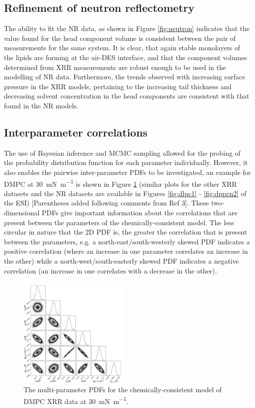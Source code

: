 \documentclass[amsmath,amssymb,twocolumn,superscriptaddress]{revtex4-1}
\begin{document}
\subsection{Refinement of neutron reflectometry}
%
The ability to fit the NR data, as shown in Figure \ref{fig:neutron} indicates that the value found for the head component volume is consistent between the pair of measurements for the same system.
It is clear, that again stable monolayers of the lipids are forming at the air-DES interface, and that the component volumes determined from XRR measurements are robust enough to be used in the modelling of NR data.
Furthermore, the trends observed with increasing surface pressure in the XRR models, pertaining to the increasing tail thickness and decreasing solvent concentration in the head components are consistent with that found in the NR models.

\subsection{Interparameter correlations}
%
The use of Bayesian inference and MCMC sampling allowed for the probing of the probability distribution function for each parameter individually.
However, it also enables the pairwise inter-parameter PDFs to be investigated, an example for DMPC at \SI{30}{\milli\newton\per\meter} is shown in Figure \ref{fig:dmpcpdfs} (similar plots for the other XRR datasets and the NR datasets are available in Figures \ref{fig:dlpc1} - \ref{fig:dppcn2} of the ESI) [Parentheses added following comments from Ref 3].
These two-dimensional PDFs give important information about the correlations that are present between the parameters of the chemically-consistent model.
The less circular in nature that the 2D PDF is, the greater the correlation that is present between the parameters, e.g. a north-east/south-westerly skewed PDF indicates a positive correlation (where an increase in one parameter correlates an increase in the other) while a north-west/south-easterly skewed PDF indicates a negative correlation (an increase in one correlates with a decrease in the other).
%
\begin{figure}
    \centering
    \includegraphics[width=0.48\textwidth]{figures/dmpc3_all_corner}
    \caption{The multi-parameter PDFs for the chemically-consistent model of DMPC XRR data at \SI{30}{\milli\newton\per\meter}.}
    \label{fig:dmpcpdfs}
\end{figure}
%
\end{document}
